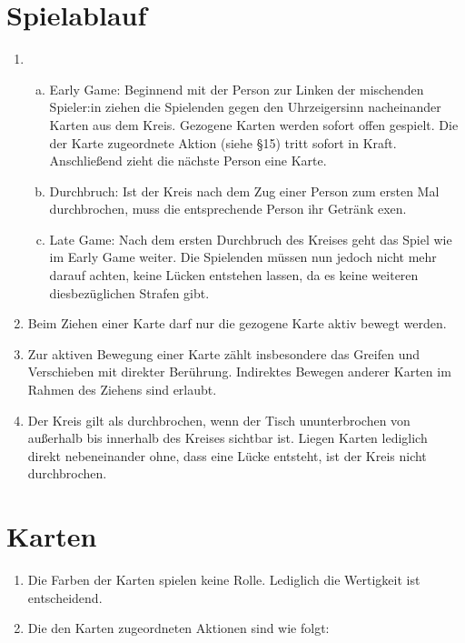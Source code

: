 \section{Spielablauf}
\begin{enumerate}[label={(\arabic*)}]
	
	\item
	\begin{enumerate}[a.]
		\item Early Game: Beginnend mit der Person zur Linken der mischenden Spieler:in ziehen die Spielenden gegen den Uhrzeigersinn nacheinander Karten aus dem Kreis. Gezogene Karten werden sofort offen gespielt. Die der Karte zugeordnete Aktion (siehe §15) tritt sofort in Kraft. Anschließend zieht die nächste Person eine Karte.
		\item Durchbruch: Ist der Kreis nach dem Zug einer Person zum ersten Mal durchbrochen, muss die entsprechende Person ihr Getränk exen.
\item Late Game: Nach dem ersten Durchbruch des Kreises geht das Spiel wie im Early Game weiter. Die Spielenden müssen nun jedoch nicht mehr darauf achten, keine Lücken entstehen lassen, da es keine weiteren diesbezüglichen Strafen gibt.
\end{enumerate}

\item
Beim Ziehen einer Karte darf nur die gezogene Karte aktiv bewegt werden.

\item
Zur aktiven Bewegung einer Karte zählt insbesondere das Greifen und Verschieben mit direkter Berührung. Indirektes Bewegen anderer Karten im Rahmen des Ziehens sind erlaubt.

\item
Der Kreis gilt als durchbrochen, wenn der Tisch ununterbrochen von außerhalb bis innerhalb des Kreises sichtbar ist. Liegen Karten lediglich direkt nebeneinander ohne, dass eine Lücke entsteht, ist der Kreis nicht durchbrochen.
\end{enumerate}

\section{Karten}\label{Ring_of_Fire:Karten}
\begin{enumerate}[label={(\arabic*)}]
	\item
	Die Farben der Karten spielen keine Rolle. Lediglich die Wertigkeit ist entscheidend.
	
	\item
	Die den Karten zugeordneten Aktionen sind wie folgt:
\end{enumerate}

